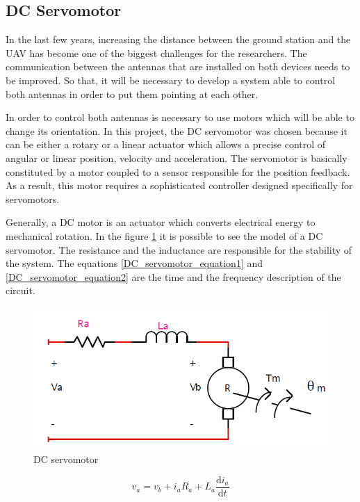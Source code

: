 \subsection*{DC Servomotor}

In the last few years, increasing the distance between the ground station and the UAV has become one of the biggest challenges for the researchers. The communication between the antennas that are installed on both devices needs to be improved. So that, it will be necessary to develop a system able to control both antennas in order to put them pointing at each other.

In order to control both antennas is necessary to use motors which will be able to change its orientation. In this project, the DC servomotor was chosen because it can be either a rotary or a linear actuator which allows a precise control of angular or linear position, velocity and acceleration. The servomotor is basically constituted by a motor coupled to a sensor responsible for the position feedback. As a result, this motor requires a sophisticated controller designed specifically for servomotors.

Generally, a DC motor is an actuator which converts electrical energy to mechanical rotation. In the figure \ref{DC_servomotor_circuit} it is possible to see the model of a DC servomotor. The resistance and the inductance are responsible for the stability of the system. The equations \ref{DC_servomotor_equation1} and \ref{DC_servomotor_equation2} are the time and the frequency description of the circuit.

\begin{figure}[H]
\centering
\includegraphics[scale=0.5]{figures/servomotor.png}
\caption{DC servomotor}
\label{DC_servomotor_circuit}
\end{figure}

\begin{equation}\label{DC_servomotor_equation1}
v_{a}= v_{b}+i_{a} R_{a}+L_{a}\frac{\mathrm{d} i_{a}}{\mathrm{d} t}
\end{equation}

